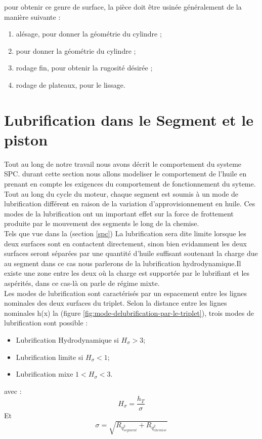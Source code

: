 pour obtenir ce genre de surface, la pièce doit être usinée généralement de la manière suivante :
\begin{enumerate}
	\item alésage, pour donner la géométrie du cylindre ;
	\item pour donner la géométrie du cylindre ;
	\item rodage fin, pour obtenir la rugosité désirée ;
	\item rodage de plateaux, pour le lissage.
\end{enumerate}

\section{Lubrification dans le Segment et le piston }
Tout au long de notre travail nous avons décrit le comportement du systeme SPC. durant cette section nous allons modeliser le comportement de l'huile en prenant en compte les exigences du comportement de fonctionnement du syteme.\\

Tout au long du cycle du moteur, chaque segment est soumis à un mode de lubrification différent en raison de la variation d’approvisionnement en huile. Ces modes de la lubrification ont un important effet sur la force de frottement produite par le mouvement des segments le long de la chemise. \\

Tels que vue dans la (section \ref{spc}) La lubrification sera dite limite lorsque les deux surfaces sont en contactent directement, sinon bien evidamment les deux surfaces seront séparées par une quantité d'huile suffisant soutenant la charge due au segment dans ce cas nous parlerons de la lubrification hydrodynamique.Il existe une zone entre les deux où la charge est supportée par le lubrifiant et les aspérités, dans ce cas-là on parle de régime mixte. \\

Les modes de lubrification sont caractérisés par un espacement entre les lignes nominales des deux surfaces du triplet. Selon la distance entre les lignes nominales h(x) la (figure \ref{fig:mode-delubrification-par-le-triplet}), trois modes de lubrification sont possible :\\
\begin{itemize}
	\item Lubrification Hydrodynamique si $H_{\sigma} > 3 $;
	\item Lubrification limite si $H_{\sigma}<1$;
	\item Lubrification mixe $1<H_{\sigma} < 3$.
\end{itemize}
avec : $$ H_{\sigma} = \frac{h_{T}}{\sigma} $$
Et 
\begin{equation}
	\sigma =\sqrt{{R}_{q}_{segment}^{2}+{R}_{q}_{chemise}^{2}}
	\label{sigma}
\end{equation}

